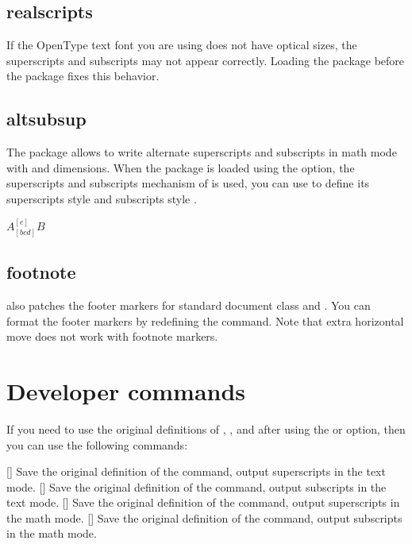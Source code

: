 \documentclass[load-preamble+]{cnltx-doc}
\begin{document}
\subsection{realscripts}
If the OpenType text font you are using does not have optical sizes, the superscripts and subscripts may not appear correctly. Loading the  package before the  package fixes this behavior.
\begin{example}
  \usepackage{realscripts,spbmark}
\end{example}

\subsection{altsubsup}
The  package allows to write alternate superscripts and subscripts in math mode with \code{\^{}} and \code{\_{}} dimensions. When the package is loaded using the  option, the superscripts and subscripts mechanism of  is used, you can use  to define its superscripts style  and subscripts style .
\begin{example}
  $A_[bcd]^[e]B$
\end{example}

\subsection{footnote}
 also patches the footer markers for standard document class and . You can format the footer markers by redefining the  command. Note that extra horizontal move does not work with footnote markers.

\section{Developer commands}
If you need to use the original definitions of , ,  and  after using the  or  option, then you can use the following commands:
\begin{commands}
  []
  Save the original definition of the  command, output superscripts in the text mode.
  []
  Save the original definition of the  command, output subscripts in the text mode.
  []
  Save the original definition of the  command, output superscripts in the math mode.
  []
  Save the original definition of the  command, output subscripts in the math mode.
\end{commands}
\end{document}
